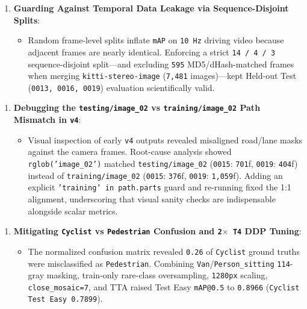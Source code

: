 \documentclass[10.5pt,a4paper]{article}
\begin{document}
\begin{enumerate}[leftmargin=1.8em,itemsep=2pt]
\item \textbf{Guarding Against Temporal Data Leakage via Sequence-Disjoint Splits}:
\begin{itemize}[leftmargin=1.5em,itemsep=2pt]
\item Random frame-level splits inflate \texttt{mAP} on \texttt{10 Hz} driving video because adjacent frames are nearly identical. Enforcing a strict \texttt{14 /\allowbreak{} 4 /\allowbreak{} 3} sequence-disjoint split---and excluding \texttt{595} MD5/dHash-matched frames when merging \texttt{kitti-\allowbreak{}stereo-\allowbreak{}image} (\texttt{7,\allowbreak{}481} images)---kept Held-out Test (\texttt{0013,\allowbreak{} 0016,\allowbreak{} 0019}) evaluation scientifically valid.
\end{itemize}
\end{enumerate}

\begin{enumerate}[leftmargin=1.8em,itemsep=2pt]
\item \textbf{Debugging the \texttt{testing/\allowbreak{}image\_\allowbreak{}02} vs \texttt{training/\allowbreak{}image\_\allowbreak{}02} Path Mismatch in \texttt{v4}}:
\begin{itemize}[leftmargin=1.5em,itemsep=2pt]
\item Visual inspection of early \texttt{v4} outputs revealed misaligned road/lane masks against the camera frames. Root-cause analysis showed \texttt{rglob('image\_\allowbreak{}02')} matched \texttt{testing/\allowbreak{}image\_\allowbreak{}02} (\texttt{0015}: \texttt{701}f, \texttt{0019}: \texttt{404}f) instead of \texttt{training/\allowbreak{}image\_\allowbreak{}02} (\texttt{0015}: \texttt{376}f, \texttt{0019}: \texttt{1,\allowbreak{}059}f). Adding an explicit \texttt{'training' in path.\allowbreak{}parts} guard and re-running fixed the 1:1 alignment, underscoring that visual sanity checks are indispensable alongside scalar metrics.
\end{itemize}
\end{enumerate}

\begin{enumerate}[leftmargin=1.8em,itemsep=2pt]
\item \textbf{Mitigating \texttt{Cyclist} vs \texttt{Pedestrian} Confusion and \texttt{2$\times$ T4} DDP Tuning}:
\begin{itemize}[leftmargin=1.5em,itemsep=2pt]
\item The normalized confusion matrix revealed \texttt{0.\allowbreak{}26} of \texttt{Cyclist} ground truths were misclassified as \texttt{Pedestrian}. Combining \texttt{Van}/\texttt{Person\_\allowbreak{}sitting} \texttt{114}-gray masking, train-only rare-class oversampling, \texttt{1280px} scaling, \texttt{close\_\allowbreak{}mosaic=7}, and TTA raised Test Easy \texttt{mAP@0.\allowbreak{}5} to \texttt{0.\allowbreak{}8966} (\texttt{Cyclist Test Easy 0.\allowbreak{}7899}).
\end{itemize}
\end{enumerate}
\end{document}
